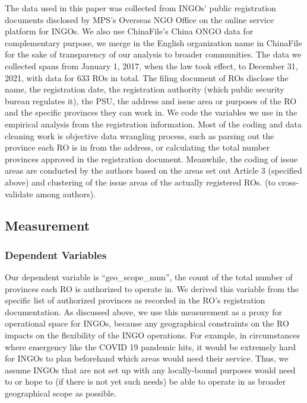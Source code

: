 \documentclass[
]{article}
\begin{document}
The data used in this paper was collected from INGOs' public
registration documents disclosed by MPS's Overseas NGO Office on the
online service platform for INGOs. We also use ChinaFile's China ONGO
data for complementary purpose, we merge in the English organization
name in ChinaFile for the sake of transparency of our analysis to
broader communities. The data we collected spans from January 1, 2017,
when the law took effect, to December 31, 2021, with data for 633 ROs in
total. The filing document of ROs disclose the name, the registration
date, the registration authority (which public security bureau regulates
it), the PSU, the address and issue area or purposes of the RO and the
specific provinces they can work in. We code the variables we use in the
empirical analysis from the registration information. Most of the coding
and data cleaning work is objective data wrangling process, such as
parsing out the province each RO is in from the address, or calculating
the total number provinces approved in the registration document.
Meanwhile, the coding of issue areas are conducted by the authors based
on the areas set out Article 3 (specified above) and clustering of the
issue areas of the actually registered ROs. (to cross-validate among
authors).

\hypertarget{measurement}{%
\subsection{Measurement}\label{measurement}}

\hypertarget{dependent-variables}{%
\subsubsection{Dependent Variables}\label{dependent-variables}}

Our dependent variable is ``geo\_scope\_num'', the count of the total
number of provinces each RO is authorized to operate in. We derived this
variable from the specific list of authorized provinces as recorded in
the RO's registration documentation. As discussed above, we use this
measurement as a proxy for operational space for INGOs, because any
geographical constraints on the RO impacts on the flexibility of the
INGO operations. For example, in circumstances where emergency like the
COVID 19 pandemic hits, it would be extremely hard for INGOs to plan
beforehand which areas would need their service. Thus, we assume INGOs
that are not set up with any locally-bound purposes would need to or
hope to (if there is not yet such needs) be able to operate in as
broader geographical scope as possible.
\end{document}
